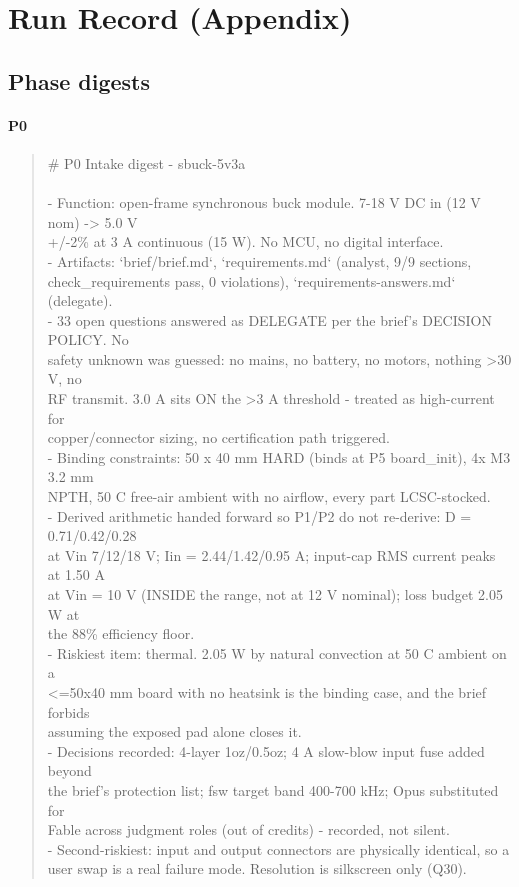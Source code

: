 \documentclass[11pt,a4paper]{article}
\begin{document}
\section{Run Record (Appendix)}
\subsection*{Phase digests}
\paragraph*{P0}
\begin{quote}\small\ttfamily\raggedright
\# P0 Intake digest - sbuck-5v3a\\
~\\
- Function: open-frame synchronous buck module. 7-18 V DC in (12 V nom) -\textgreater{} 5.0 V\\
  +/-2\% at 3 A continuous (15 W). No MCU, no digital interface.\\
- Artifacts: `brief/brief.md`, `requirements.md` (analyst, 9/9 sections,\\
  check\_requirements pass, 0 violations), `requirements-answers.md` (delegate).\\
- 33 open questions answered as DELEGATE per the brief's DECISION POLICY. No\\
  safety unknown was guessed: no mains, no battery, no motors, nothing \textgreater{}30 V, no\\
  RF transmit. 3.0 A sits ON the \textgreater{}3 A threshold - treated as high-current for\\
  copper/connector sizing, no certification path triggered.\\
- Binding constraints: 50 x 40 mm HARD (binds at P5 board\_init), 4x M3 3.2 mm\\
  NPTH, 50 C free-air ambient with no airflow, every part LCSC-stocked.\\
- Derived arithmetic handed forward so P1/P2 do not re-derive: D = 0.71/0.42/0.28\\
  at Vin 7/12/18 V; Iin = 2.44/1.42/0.95 A; input-cap RMS current peaks at 1.50 A\\
  at Vin = 10 V (INSIDE the range, not at 12 V nominal); loss budget 2.05 W at\\
  the 88\% efficiency floor.\\
- Riskiest item: thermal. 2.05 W by natural convection at 50 C ambient on a\\
  \textless{}=50x40 mm board with no heatsink is the binding case, and the brief forbids\\
  assuming the exposed pad alone closes it.\\
- Decisions recorded: 4-layer 1oz/0.5oz; 4 A slow-blow input fuse added beyond\\
  the brief's protection list; fsw target band 400-700 kHz; Opus substituted for\\
  Fable across judgment roles (out of credits) - recorded, not silent.\\
- Second-riskiest: input and output connectors are physically identical, so a\\
  user swap is a real failure mode. Resolution is silkscreen only (Q30).
\end{quote}
\end{document}
